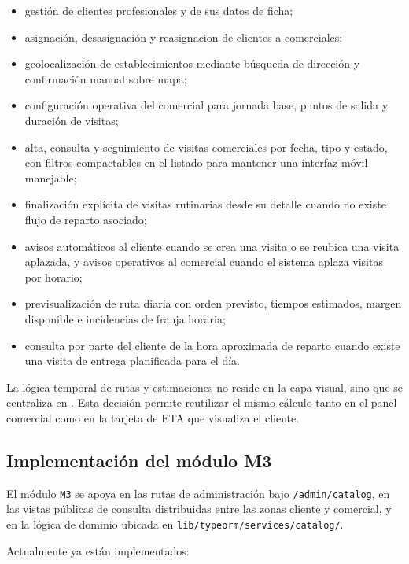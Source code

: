 \begin{itemize}
    \item gestión de clientes profesionales y de sus datos de ficha;
    \item asignación, desasignación y reasignacion de clientes a comerciales;
    \item geolocalización de establecimientos mediante búsqueda de dirección y confirmación manual sobre mapa;
    \item configuración operativa del comercial para jornada base, puntos de salida y duración de visitas;
    \item alta, consulta y seguimiento de visitas comerciales por fecha, tipo y estado, con filtros compactables en el listado para mantener una interfaz móvil manejable;
    \item finalización explícita de visitas rutinarias desde su detalle cuando no existe flujo de reparto asociado;
    \item avisos automáticos al cliente cuando se crea una visita o se reubica una visita aplazada, y avisos operativos al comercial cuando el sistema aplaza visitas por horario;
    \item previsualización de ruta diaria con orden previsto, tiempos estimados, margen disponible e incidencias de franja horaria;
    \item consulta por parte del cliente de la hora aproximada de reparto cuando existe una visita de entrega planificada para el día.
\end{itemize}

La lógica temporal de rutas y estimaciones no reside en la capa visual, sino que se centraliza en . Esta decisión permite reutilizar el mismo cálculo tanto en el panel comercial como en la tarjeta de ETA que visualiza el cliente.

\subsection{Implementación del módulo M3}

El módulo \texttt{M3} se apoya en las rutas de administración bajo \texttt{/admin/catalog}, en las vistas públicas de consulta distribuidas entre las zonas cliente y comercial, y en la lógica de dominio ubicada en \texttt{lib/typeorm/services/catalog/}.

Actualmente ya están implementados:

